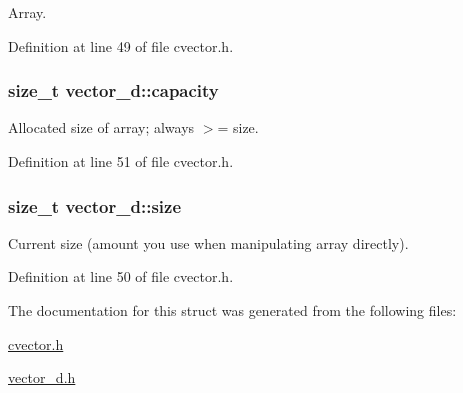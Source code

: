 Array. 



Definition at line 49 of file cvector.\-h.

\hypertarget{structvector__d_a83fb5c9689de179f0dfe1413d720cdc3}{
\subsubsection[{capacity}]{\setlength{\rightskip}{0pt plus 5cm}size\-\_\-t vector\-\_\-d\-::capacity}}\label{structvector__d_a83fb5c9689de179f0dfe1413d720cdc3}


Allocated size of array; always $>$= size. 



Definition at line 51 of file cvector.\-h.

\hypertarget{structvector__d_a1a8bccf26d9cef41fd453f6feb2f15b1}{
\subsubsection[{size}]{\setlength{\rightskip}{0pt plus 5cm}size\-\_\-t vector\-\_\-d\-::size}}\label{structvector__d_a1a8bccf26d9cef41fd453f6feb2f15b1}


Current size (amount you use when manipulating array directly). 



Definition at line 50 of file cvector.\-h.



The documentation for this struct was generated from the following files\-:\begin{DoxyCompactItemize}
\item 
\hyperlink{cvector_8h}{cvector.\-h}\item 
\hyperlink{vector__d_8h}{vector\-\_\-d.\-h}\end{DoxyCompactItemize}
